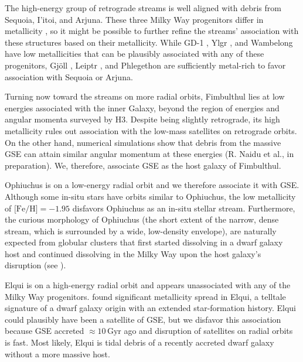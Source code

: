 \documentclass[twocolumn]{aastex63}
\newcommand{\gyr}{\ensuremath{\textrm{Gyr}}}
\newcommand{\feh}{\ensuremath{\textrm{[Fe/H]}}}
\begin{document}
The high-energy group of retrograde streams is well aligned with debris from Sequoia, I'itoi, and Arjuna.
These three Milky Way progenitors differ in metallicity \citep{naidu2020}, so it might be possible to further refine the streams' association with these structures based on their metallicity.
While GD-1 \citep[spectroscopic $\feh=-2.3$,][]{bonaca2020b}, Ylgr \citep[spectroscopic $\feh=-1.9$,][]{ibata2019}, and  Wambelong \citep[isochrone $\feh=-2.2$,][]{shipp2018} have low metallicities that can be plausibly associated with any of these progenitors, Gj\" oll \citep[spectroscopic $\feh=-1.5$,][]{hansen2020}, Leiptr \citep[isochrone $\feh=-1.6$,][]{ibata2019}, and Phlegethon \citep[spectroscopic $\feh=-1.6$,][]{ibata2018} are sufficiently metal-rich to favor association with Sequoia or Arjuna.

Turning now toward the streams on more radial orbits, Fimbulthul lies at low energies associated with the inner Galaxy, beyond the region of energies and angular momenta surveyed by H3.
Despite being slightly retrograde, its high metallicity rules out association with the low-mass satellites on retrograde orbits.
On the other hand, numerical simulations show that debris from the massive GSE can attain similar angular momentum at these energies (R. Naidu et al., in preparation).
We, therefore, associate GSE as the host galaxy of Fimbulthul.

Ophiuchus is on a low-energy radial orbit and we therefore associate it with GSE.
Although some in-situ stars have orbits similar to Ophiuchus, the low metallicity of $\feh=-1.95$ \citep{sesar2015} disfavors Ophiuchus as an in-situ stellar stream.
Furthermore, the curious morphology of Ophiuchus (the short extent of the narrow, dense stream, which is surrounded by a wide, low-density envelope), are naturally expected from globular clusters that first started dissolving in a dwarf galaxy host and continued dissolving in the Milky Way upon the host galaxy's disruption (see \citealt{carlberg2018, malhan2020}).

Elqui is on a high-energy radial orbit and appears unassociated with any of the Milky Way progenitors.
\citet{ji2020} found significant metallicity spread in Elqui, a telltale signature of a dwarf galaxy origin with an extended star-formation history.
Elqui could plausibly have been a satellite of GSE, but we disfavor this association because GSE accreted $\approx10\,\gyr$ ago \citep{bonaca2020c} and disruption of satellites on radial orbits is fast.
Most likely, Elqui is tidal debris of a recently accreted dwarf galaxy without a more massive host.
\end{document}
